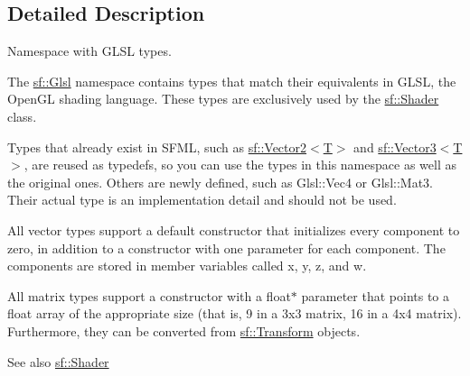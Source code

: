 \subsection{Detailed Description}
Namespace with G\+L\+SL types. 

The \hyperlink{namespacesf_1_1_glsl}{sf\+::\+Glsl} namespace contains types that match their equivalents in G\+L\+SL, the Open\+GL shading language. These types are exclusively used by the \hyperlink{classsf_1_1_shader}{sf\+::\+Shader} class.

Types that already exist in S\+F\+ML, such as \hyperlink{classsf_1_1_vector2}{sf\+::\+Vector2$<$\+T$>$} and \hyperlink{classsf_1_1_vector3}{sf\+::\+Vector3$<$\+T$>$}, are reused as typedefs, so you can use the types in this namespace as well as the original ones. Others are newly defined, such as Glsl\+::\+Vec4 or Glsl\+::\+Mat3. Their actual type is an implementation detail and should not be used.

All vector types support a default constructor that initializes every component to zero, in addition to a constructor with one parameter for each component. The components are stored in member variables called x, y, z, and w.

All matrix types support a constructor with a float$\ast$ parameter that points to a float array of the appropriate size (that is, 9 in a 3x3 matrix, 16 in a 4x4 matrix). Furthermore, they can be converted from \hyperlink{classsf_1_1_transform}{sf\+::\+Transform} objects.

\begin{DoxySeeAlso}{See also}
\hyperlink{classsf_1_1_shader}{sf\+::\+Shader} 
\end{DoxySeeAlso}
